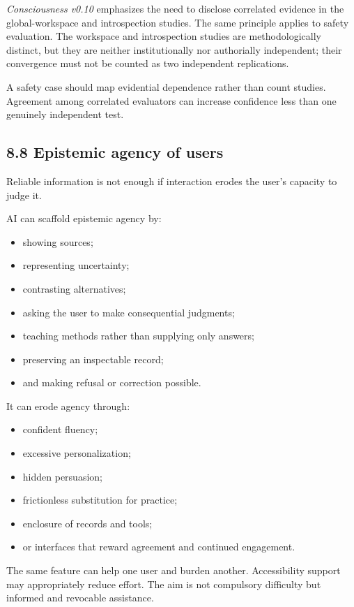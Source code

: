 \documentclass[
  11pt,
]{article}
\providecommand{\tightlist}{%
  \setlength{\itemsep}{0pt}\setlength{\parskip}{0pt}}
\begin{document}
\emph{Consciousness v0.10} emphasizes the need to disclose correlated
evidence in the global-workspace and introspection studies. The same
principle applies to safety evaluation. The workspace and introspection
studies are methodologically distinct, but they are neither
institutionally nor authorially independent; their convergence must not
be counted as two independent replications.

A safety case should map evidential dependence rather than count
studies. Agreement among correlated evaluators can increase confidence
less than one genuinely independent test.

\subsection{8.8 Epistemic agency of
users}\label{epistemic-agency-of-users}

Reliable information is not enough if interaction erodes the user's
capacity to judge it.

AI can scaffold epistemic agency by:

\begin{itemize}
\tightlist
\item
  showing sources;
\item
  representing uncertainty;
\item
  contrasting alternatives;
\item
  asking the user to make consequential judgments;
\item
  teaching methods rather than supplying only answers;
\item
  preserving an inspectable record;
\item
  and making refusal or correction possible.
\end{itemize}

It can erode agency through:

\begin{itemize}
\tightlist
\item
  confident fluency;
\item
  excessive personalization;
\item
  hidden persuasion;
\item
  frictionless substitution for practice;
\item
  enclosure of records and tools;
\item
  or interfaces that reward agreement and continued engagement.
\end{itemize}

The same feature can help one user and burden another. Accessibility
support may appropriately reduce effort. The aim is not compulsory
difficulty but informed and revocable assistance.
\end{document}
